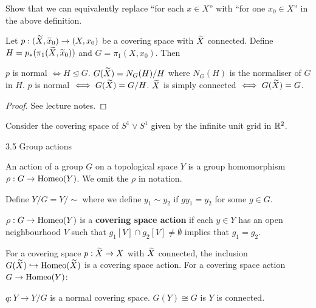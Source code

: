 \begin{exer}
  Show that we can equivalently replace ``for each $x \in X$'' with ``for one $x_0 \in X$'' in the above definition.
\end{exer}

\begin{prop}
  Let $p:(\widetilde X,\widetilde x_0) \to (X,x_0)$ be a covering space with $\widetilde X$ connected.
  Define $H = p_*(\pi_1(\widetilde X,\widetilde x_0))$ and $G = \pi_1(X,x_0)$.
  Then
  \begin{enum}
    \io $p$ is normal $\iff H \trianglelefteq G$.
    \io $G(\widetilde X) = N_G(H)/H$ where $N_G(H)$ is the normaliser of $G$ in $H$.
    \io $p$ is normal $\iff G(\widetilde X) = G/H$.
    \io $\widetilde X$ is simply connected $ \iff G(\widetilde X)=G$.
  \end{enum}
\end{prop}

\begin{proof}
  See lecture notes.
\end{proof}

\begin{exam}
  Consider the covering space of $S^1 \vee S^1$ given by the infinite unit grid in $\mathbb{R}^2$.
\end{exam}

3.5 Group actions

\begin{defn}
  An action of a group $G$ on a topological space $Y$ is a group homomorphism $\rho: G \to \operatorname{Homeo}(Y)$.
  We omit the $\rho$ in notation.
  
  Define $Y/G = Y/\sim$ where we define $y_1 \sim y_2$ if $gy_1=y_2$ for some $g \in G$.
\end{defn}

\begin{defn}
  $\rho: G \to \operatorname{Homeo}(Y)$ is a \textbf{covering space action} if each $y \in Y$ has an open neighbourhood $V$ such that $g_1[V] \cap g_2[V] \neq \emptyset$ implies that $g_1=g_2$.
\end{defn}

\begin{prop}
  \leavevmode
  \begin{enum}
    \io For a covering space $p: \widetilde X \to X$ with $\widetilde X$ connected, the inclusion $G(\widetilde X) \hookrightarrow \operatorname{Homeo}(\widetilde X)$ is a covering space action.
    \io For a covering space action $G \to \operatorname{Homeo}(Y)$:
      \begin{enum}
	\io $q: Y \to Y/G$ is a normal covering space.
	\io $G(Y) \cong G$ is $Y$ is connected.
      \end{enum}
  \end{enum}
\end{prop}
